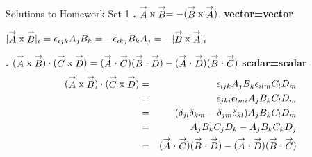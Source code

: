 \newpage
\thispagestyle{empty}
{\flushleft Solutions to Homework Set 1}
{\bf {}.}   $ \stackrel{\rightarrow}{A} \textup{x} \stackrel{\rightarrow}{B} = - (\stackrel{\rightarrow}{B} \textup{x} \stackrel{\rightarrow}{A})$.
{\flushleft \bf vector=vector}

 $[ \stackrel{\rightarrow}{A} \textup{x} \stackrel{\rightarrow}{B}]_i=
 \epsilon_{ijk}A_jB_k= - \epsilon_{ikj}B_kA_j = -[ \stackrel{\rightarrow}{B} \textup{x} \stackrel{\rightarrow}{A}]_i$
\vspace{.1in}

{\bf {}.} $(\stackrel{\rightarrow}{A} \textup{x} \stackrel{\rightarrow}{B})\cdot (\stackrel{\rightarrow}{C} \textup{x} \stackrel{\rightarrow}{D})=(\stackrel{\rightarrow}{A} \cdot \stackrel{\rightarrow}{C})(\stackrel{\rightarrow}{B} \cdot \stackrel{\rightarrow}{D} ) -
(\stackrel{\rightarrow}{A} \cdot \stackrel{\rightarrow}{D})(\stackrel{\rightarrow}{B} \cdot \stackrel{\rightarrow}{C} )$
{\flushleft \bf scalar=scalar}
\begin{eqnarray*}
(\stackrel{\rightarrow}{A} \textup{x} \stackrel{\rightarrow}{B})
\cdot (\stackrel{\rightarrow}{C} \textup{x} \stackrel{\rightarrow}{D})&=&
\epsilon_{ijk}A_jB_k\epsilon_{ilm}C_lD_m\\
&=&\epsilon_{jki}\epsilon_{lmi}A_jB_kC_lD_m\\
&=&(\delta_{jl}\delta_{km}-\delta_{jm}\delta_{kl})A_jB_kC_lD_m\\
&=&A_jB_kC_jD_k-A_jB_kC_kD_j\\
&=&(\stackrel{\rightarrow}{A} \cdot \stackrel{\rightarrow}{C})(\stackrel{\rightarrow}{B} \cdot \stackrel{\rightarrow}{D} ) -
(\stackrel{\rightarrow}{A} \cdot \stackrel{\rightarrow}{D})(\stackrel{\rightarrow}{B} \cdot \stackrel{\rightarrow}{C} )
\end{eqnarray*}

